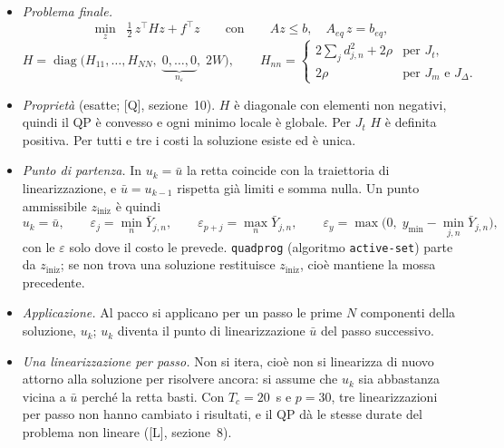 \documentclass[11pt,a4paper]{article}
\newcommand{\Tc}{T_c}
\newcommand{\rif}{[L]}                      %
\newcommand{\rifq}{[Q]}                     %
\newcommand{\ip}[1]{\textbf{(H#1)}}         %
\begin{document}
\begin{itemize}
  \item \emph{Problema finale.}
        \[
          \min_{z} \;\; \tfrac12\, z^\top H z + f^\top z
          \qquad \text{con} \qquad A z \le b , \quad A_{eq}\, z = b_{eq} ,
        \]
        \[
          H = \operatorname{diag}\bigl(H_{11}, \dots, H_{NN},\;
              \underbrace{0, \dots, 0}_{n_\varepsilon},\; 2W\bigr) ,
          \qquad
          H_{nn} =
          \begin{cases}
            2\sum_j d_{j,n}^2 + 2\rho & \text{per } J_t , \\[2pt]
            2\rho & \text{per } J_m \text{ e } J_\Delta .
          \end{cases}
        \]
  \item \emph{Proprietà} (esatte; {\rifq}, sezione~10). $H$ è diagonale con
        elementi non negativi, quindi il QP è convesso e ogni minimo locale è
        globale. Per $J_t$ $H$ è definita positiva. Per tutti e tre i costi la
        soluzione esiste ed è unica.
  \item \emph{Punto di partenza.} In $u_k = \bar u$ la retta coincide con la
        traiettoria di linearizzazione, e $\bar u = u_{k-1}$ rispetta già
        limiti e somma nulla. Un punto ammissibile $z_{\mathrm{iniz}}$ è quindi
        \[
          u_k = \bar u , \qquad
          \varepsilon_j = \min_n \bar Y_{j,n} , \qquad
          \varepsilon_{p+j} = \max_n \bar Y_{j,n} , \qquad
          \varepsilon_y = \max\bigl(0,\; y_{\min} - \min_{j,n} \bar Y_{j,n}\bigr) ,
        \]
        con le $\varepsilon$ solo dove il costo le prevede. \texttt{quadprog}
        (algoritmo \texttt{active-set}) parte da $z_{\mathrm{iniz}}$; se non trova una
        soluzione restituisce $z_{\mathrm{iniz}}$, cioè mantiene la mossa precedente.
  \item \emph{Applicazione.} Al pacco si applicano per un passo le prime $N$
        componenti della soluzione, $u_k$; $u_k$ diventa il punto di
        linearizzazione $\bar u$ del passo successivo.
  \item[\ip{15}] \emph{Una linearizzazione per passo.} Non si itera, cioè non
        si linearizza di nuovo attorno alla soluzione per risolvere ancora: si
        assume che $u_k$ sia abbastanza vicina a $\bar u$ perché la retta
        basti. Con $\Tc = 20$~s e $p = 30$, tre linearizzazioni per passo non
        hanno cambiato i risultati, e il QP dà le stesse durate del problema
        non lineare ({\rif}, sezione~8).
\end{itemize}
\end{document}
